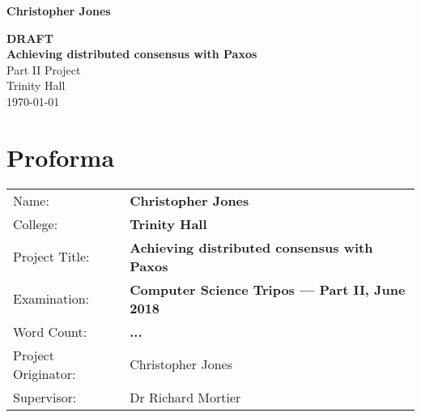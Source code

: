 \documentclass[12pt,twoside,notitlepage]{report}
\begin{document}





\pagestyle{empty}

\hfill{\LARGE \bf Christopher Jones}

\vspace*{60mm}
\begin{center}
\Huge
{\bf \color{red} DRAFT} \\
{\bf Achieving distributed consensus with Paxos} \\
\vspace*{5mm}
Part II Project \\
\vspace*{5mm}
Trinity Hall \\
\vspace*{5mm}
\today  %
\end{center}

\cleardoublepage



\setcounter{page}{1}
\pagestyle{plain}

\chapter*{Proforma}

{\large
\begin{tabular}{ll}
Name:                       & \bf Christopher Jones                       \\
College:                    & \bf Trinity Hall                     \\
Project Title:             & \bf Achieving distributed consensus with Paxos \\
Examination:            & \bf Computer Science Tripos --- Part II, June 2018 \\
Word Count:            & \bf ...\footnotemark[1] \\
Project Originator:  & Christopher Jones                    \\
Supervisor:              & Dr Richard Mortier                    \\ 
\end{tabular}
}
\end{document}
